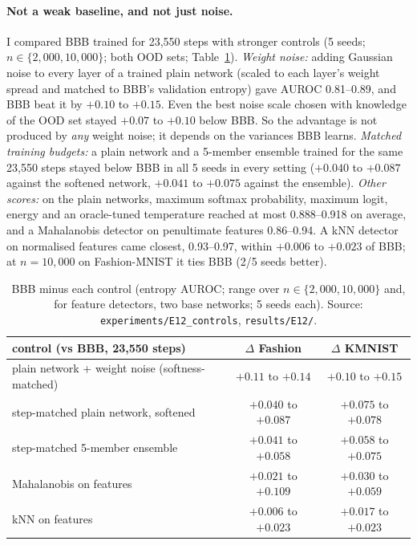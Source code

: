 \documentclass[11pt]{article}
\begin{document}
\paragraph{Not a weak baseline, and not just noise.} I compared BBB trained
for 23{,}550 steps with stronger controls (5 seeds; $n\in\{2{,}000,
10{,}000\}$; both OOD sets; Table~\ref{tab:controls}).
\emph{Weight noise:} adding Gaussian noise to every layer of a trained plain
network (scaled to each layer's weight spread and matched to BBB's
validation entropy) gave AUROC 0.81--0.89, and BBB beat it by $+0.10$ to
$+0.15$. Even the best noise scale chosen with knowledge of the OOD set
stayed $+0.07$ to $+0.10$ below BBB. So the advantage is not produced by
\emph{any} weight noise; it depends on the variances BBB learns.
\emph{Matched training budgets:} a plain network and a 5-member ensemble
trained for the same 23{,}550 steps stayed below BBB in all 5 seeds in every
setting ($+0.040$ to $+0.087$ against the softened network, $+0.041$ to $+0.075$
against the ensemble). \emph{Other scores:} on the plain networks, maximum
softmax probability, maximum logit, energy and an oracle-tuned temperature
reached at most 0.888--0.918 on average, and a Mahalanobis detector on
penultimate features 0.86--0.94. A kNN detector on normalised features came
closest, 0.93--0.97, within $+0.006$ to $+0.023$ of BBB; at $n=10{,}000$ on
Fashion-MNIST it ties BBB (2/5 seeds better).

\begin{table}[!htb]
\centering\small
\begin{tabular}{lcc}
\toprule
control (vs BBB, 23{,}550 steps) & $\Delta$ Fashion & $\Delta$ KMNIST \\
\midrule
plain network + weight noise (softness-matched) & $+0.11$ to $+0.14$ & $+0.10$ to $+0.15$ \\
step-matched plain network, softened & $+0.040$ to $+0.087$ & $+0.075$ to $+0.078$ \\
step-matched 5-member ensemble & $+0.041$ to $+0.058$ & $+0.058$ to $+0.075$ \\
Mahalanobis on features & $+0.021$ to $+0.109$ & $+0.030$ to $+0.059$ \\
kNN on features & $+0.006$ to $+0.023$ & $+0.017$ to $+0.023$ \\
\bottomrule
\end{tabular}
\caption{BBB minus each control (entropy AUROC; range over $n\in\{2{,}000,
10{,}000\}$ and, for feature detectors, two base networks; 5 seeds each).
Source: \texttt{experiments/E12\_controls}, \texttt{results/E12/}.}
\label{tab:controls}
\end{table}
\end{document}
